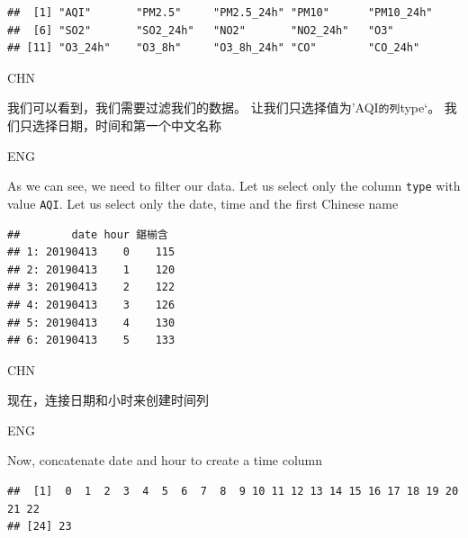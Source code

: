 \documentclass[]{book}
\newenvironment{Shaded}{\begin{snugshade}}{\end{snugshade}}
\newcommand{\KeywordTok}[1]{\textcolor[rgb]{0.13,0.29,0.53}{\textbf{#1}}}
\newcommand{\NormalTok}[1]{#1}
\newcommand{\OperatorTok}[1]{\textcolor[rgb]{0.81,0.36,0.00}{\textbf{#1}}}
\newcommand{\StringTok}[1]{\textcolor[rgb]{0.31,0.60,0.02}{#1}}
\begin{document}
\begin{verbatim}
##  [1] "AQI"       "PM2.5"     "PM2.5_24h" "PM10"      "PM10_24h" 
##  [6] "SO2"       "SO2_24h"   "NO2"       "NO2_24h"   "O3"       
## [11] "O3_24h"    "O3_8h"     "O3_8h_24h" "CO"        "CO_24h"
\end{verbatim}

CHN

我们可以看到，我们需要过滤我们的数据。 让我们只选择值为'AQI\texttt{的列}type`。
我们只选择日期，时间和第一个中文名称

ENG

As we can see, we need to filter our data. Let us select only the column \texttt{type} with value \texttt{AQI}.
Let us select only the date, time and the first Chinese name

\begin{Shaded}
\end{Shaded}

\begin{verbatim}
##        date hour 鍖椾含
## 1: 20190413    0    115
## 2: 20190413    1    120
## 3: 20190413    2    122
## 4: 20190413    3    126
## 5: 20190413    4    130
## 6: 20190413    5    133
\end{verbatim}

CHN

现在，连接日期和小时来创建时间列

ENG

Now, concatenate date and hour to create a time column

\begin{Shaded}
\end{Shaded}

\begin{verbatim}
##  [1]  0  1  2  3  4  5  6  7  8  9 10 11 12 13 14 15 16 17 18 19 20 21 22
## [24] 23
\end{verbatim}
\end{document}

